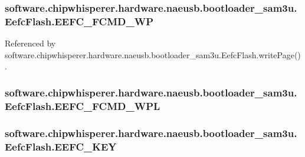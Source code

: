 \subsubsection[{E\+E\+F\+C\+\_\+\+F\+C\+M\+D\+\_\+\+W\+P}]{\setlength{\rightskip}{0pt plus 5cm}software.\+chipwhisperer.\+hardware.\+naeusb.\+bootloader\+\_\+sam3u.\+Eefc\+Flash.\+E\+E\+F\+C\+\_\+\+F\+C\+M\+D\+\_\+\+W\+P}\label{classsoftware_1_1chipwhisperer_1_1hardware_1_1naeusb_1_1bootloader__sam3u_1_1EefcFlash_ab4b74948aa2a5f3fbf945fc2f4ec0037}


Referenced by software.\+chipwhisperer.\+hardware.\+naeusb.\+bootloader\+\_\+sam3u.\+Eefc\+Flash.\+write\+Page().

\hypertarget{classsoftware_1_1chipwhisperer_1_1hardware_1_1naeusb_1_1bootloader__sam3u_1_1EefcFlash_ad29d3f511601bbb7c36b9adf3e6af59a}{}
\subsubsection[{E\+E\+F\+C\+\_\+\+F\+C\+M\+D\+\_\+\+W\+P\+L}]{\setlength{\rightskip}{0pt plus 5cm}software.\+chipwhisperer.\+hardware.\+naeusb.\+bootloader\+\_\+sam3u.\+Eefc\+Flash.\+E\+E\+F\+C\+\_\+\+F\+C\+M\+D\+\_\+\+W\+P\+L}\label{classsoftware_1_1chipwhisperer_1_1hardware_1_1naeusb_1_1bootloader__sam3u_1_1EefcFlash_ad29d3f511601bbb7c36b9adf3e6af59a}
\hypertarget{classsoftware_1_1chipwhisperer_1_1hardware_1_1naeusb_1_1bootloader__sam3u_1_1EefcFlash_ac838bb53fa740659d7977b0ac60462ea}{}
\subsubsection[{E\+E\+F\+C\+\_\+\+K\+E\+Y}]{\setlength{\rightskip}{0pt plus 5cm}software.\+chipwhisperer.\+hardware.\+naeusb.\+bootloader\+\_\+sam3u.\+Eefc\+Flash.\+E\+E\+F\+C\+\_\+\+K\+E\+Y}\label{classsoftware_1_1chipwhisperer_1_1hardware_1_1naeusb_1_1bootloader__sam3u_1_1EefcFlash_ac838bb53fa740659d7977b0ac60462ea}


